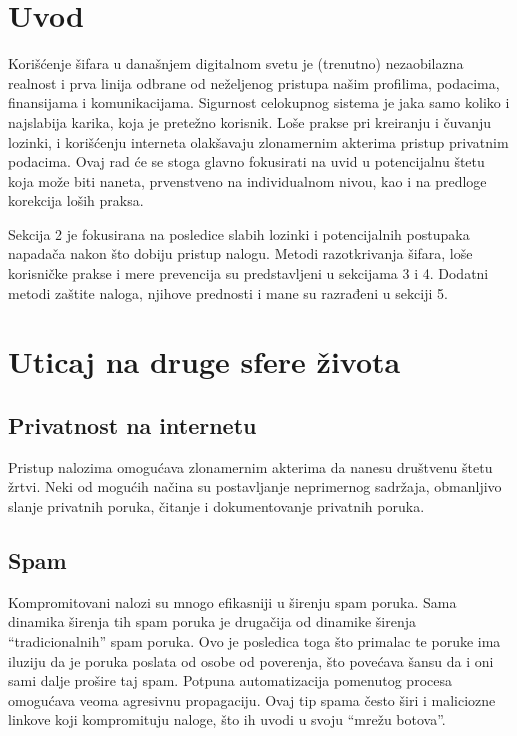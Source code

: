 \documentclass[fleqn, 12pt]{article}
\begin{document}


\setcounter{tocdepth}{2}
\tableofcontents

\newpage

\section{Uvod}
\indent Korišćenje šifara u današnjem digitalnom svetu je (trenutno) nezaobilazna realnost i prva linija odbrane od neželjenog pristupa našim profilima, podacima, finansijama i komunikacijama. Sigurnost celokupnog sistema je jaka samo koliko i najslabija karika, koja je pretežno korisnik. Loše prakse pri kreiranju i čuvanju lozinki, i korišćenju interneta olakšavaju zlonamernim akterima pristup privatnim podacima. Ovaj rad će se stoga glavno fokusirati na uvid u potencijalnu štetu koja može biti naneta, prvenstveno na individualnom nivou, kao i na predloge korekcija loših praksa. 

Sekcija 2 je fokusirana na posledice slabih lozinki i potencijalnih postupaka napadača nakon što dobiju pristup nalogu. Metodi razotkrivanja šifara, loše korisničke prakse i mere prevencija su predstavljeni u sekcijama 3 i 4. Dodatni metodi zaštite naloga, njihove prednosti i mane su razrađeni u sekciji 5. 

\section{Uticaj na druge sfere života}

\subsection{Privatnost na internetu}
\indent Pristup nalozima omogućava zlonamernim akterima da nanesu društvenu štetu žrtvi. Neki od mogućih načina su postavljanje neprimernog sadržaja, obmanljivo slanje privatnih poruka, čitanje i dokumentovanje privatnih poruka.

\subsection{Spam}
\indent Kompromitovani nalozi su mnogo efikasniji u širenju spam poruka. Sama dinamika širenja tih spam poruka je drugačija od dinamike širenja ``tradicionalnih'' spam poruka. Ovo je posledica toga što primalac te poruke ima iluziju da je poruka poslata od osobe od poverenja, što povećava šansu da i oni sami dalje prošire taj spam. Potpuna automatizacija pomenutog procesa omogućava veoma agresivnu propagaciju. \cite{spam}
Ovaj tip spama često širi i maliciozne linkove koji kompromituju naloge, što ih uvodi u svoju ``mrežu botova''.
\end{document}
